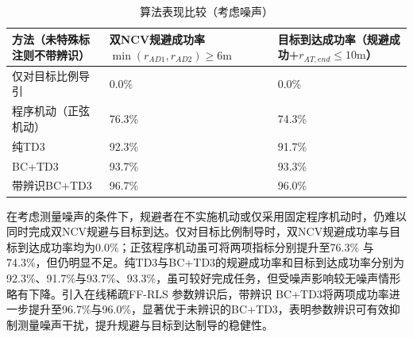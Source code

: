 \begin{table}[htbp]
\centering
\caption{算法表现比较（考虑噪声）}
\label{tab:perf-noise}
\small
\begin{tabularx}{\linewidth}{lXX}
\toprule
方法（未特殊标注则不带辨识） & 双NCV规避成功率$\min ({r_{AD1}},{r_{AD2}}) \geqslant 6{\text{m}}$ & 目标到达成功率（规避成功+${r_{AT,end}} \leqslant 10{\text{m}}$） \\
\midrule
仅对目标比例导引 & 0.0\% & 0.0\% \\
程序机动（正弦机动） & 76.3\% & 74.3\% \\
纯TD3 & 92.3\% & 91.7\% \\
BC+TD3 & 93.7\% & 93.3\% \\
带辨识BC+TD3 & 96.7\% & 96.0\% \\
\bottomrule
\end{tabularx}
\end{table}
在考虑测量噪声的条件下，规避者在不实施机动或仅采用固定程序机动时，仍难以同时完成双NCV规避与目标到达。仅对目标比例制导时，双NCV规避成功率与目标到达成功率均为0.0\%；正弦程序机动虽可将两项指标分别提升至76.3\% 与 74.3\%，但仍明显不足。纯TD3与BC+TD3的规避成功率和目标到达成功率分别为92.3\%、91.7\%与93.7\%、93.3\%，虽可较好完成任务，但受噪声影响较无噪声情形略有下降。引入在线稀疏FF-RLS 参数辨识后，带辨识 BC+TD3将两项成功率进一步提升至96.7\%与96.0\%，显著优于未辨识的BC+TD3，表明参数辨识可有效抑制测量噪声干扰，提升规避与目标到达制导的稳健性。

